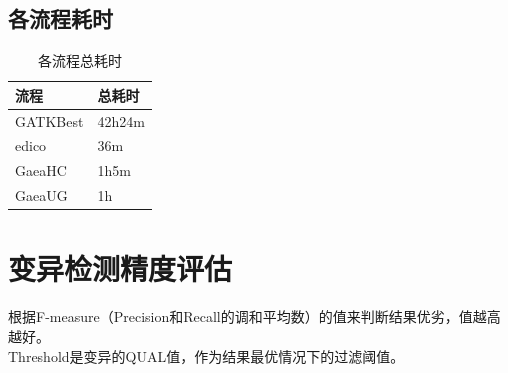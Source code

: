 \documentclass[UTF8,10pt,a4paper]{ctexart}
\begin{document}
\subsection{各流程耗时}
\begin{table}[htp]
\newcommand{\tabincell}[2]{\begin{tabular}{@{}#1@{}}#2\end{tabular}}
{\small
\caption{各流程总耗时}
\begin{center}
\begin{tabular}{p{5cm}|p{5cm}}
\hline
流程 & 总耗时 \\
\hline
GATKBest & 42h24m \\
edico & 36m \\
GaeaHC\footnotemark[1] & 1h5m \\
GaeaUG\footnotemark[1] & 1h \\
\hline
\end{tabular}
\end{center}
\label{default}
}
\end{table}

\section{变异检测精度评估}
根据F-measure（Precision和Recall的调和平均数）的值来判断结果优劣，值越高越好。\\
Threshold是变异的QUAL值，作为结果最优情况下的过滤阈值。
\newpage
\end{document}
